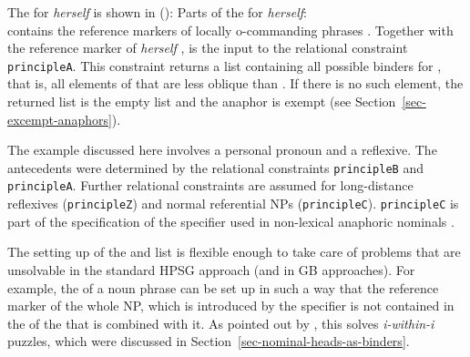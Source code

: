 \documentclass[output=paper
 	        ,biblatex
                ,babelshorthands
                ,newtxmath
                ,draftmode
                ,colorlinks, citecolor=brown
]{langscibook}
\begin{document}
The \synsemv for \emph{herself} is shown in ():
\eas
Parts of the \synsemv for \emph{herself}:\\
\zs
\lista contains the reference markers of locally o-commanding phrases . Together with the
reference marker of \emph{herself} ,  is the input to the relational constraint
\texttt{principleA}. This constraint returns a list containing all possible binders for ,
that is, all elements of  that are less oblique than . If there is no such element,
the returned list is the empty list and the anaphor is exempt (see Section~\ref{sec-excempt-anaphors}).

The example discussed here involves a personal pronoun and a reflexive. The antecedents were
determined by the relational constraints \texttt{principleB} and \texttt{prin\-cipleA}. Further
relational constraints are assumed for long-distance reflexives (\texttt{principleZ}) and normal
referential NPs (\texttt{principleC}). \texttt{principleC} is part of the specification of the
specifier used in non-lexical anaphoric nominals \citep[]{Branco2002a}.

The setting up of the \lista and \listu list is flexible enough to take care of problems that are
unsolvable in the standard HPSG approach (and in GB approaches). For example, the \listul of a noun
phrase can be set up in such a way that the reference marker of the whole NP, which is introduced by
the specifier is not contained in the \listul of the \nbar that is combined with it. As pointed out
by \citet[]{Branco2002a}, this solves \emph{i-within-i} puzzles, which were discussed in Section~\ref{sec-nominal-heads-as-binders}.
\end{document}
